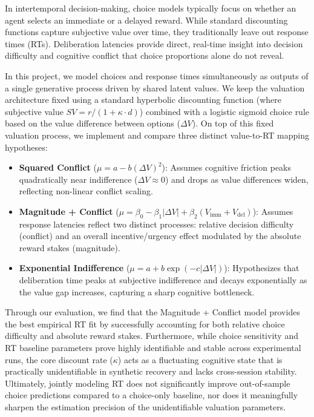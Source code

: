 \documentclass[11pt,a4paper]{article}
\theoremstyle{definition}
\begin{document}
In intertemporal decision-making, choice models typically focus on whether an agent selects an immediate or a delayed reward. While standard discounting functions capture subjective value over time, they traditionally leave out response times (RTs). Deliberation latencies provide direct, real-time insight into decision difficulty and cognitive conflict that choice proportions alone do not reveal.

In this project, we model choices and response times simultaneously as outputs of a single generative process driven by shared latent values. We keep the valuation architecture fixed using a standard hyperbolic discounting function (where subjective value $SV = r / (1 + \kappa \cdot d)$) combined with a logistic sigmoid choice rule based on the value difference between options ($\Delta V$). On top of this fixed valuation process, we implement and compare three distinct value-to-RT mapping hypotheses:

\begin{itemize}
    \item \textbf{Squared Conflict} ($\mu = a - b(\Delta V)^2$): Assumes cognitive friction peaks quadratically near indifference ($\Delta V \approx 0$) and drops as value differences widen, reflecting non-linear conflict scaling.
    \item \textbf{Magnitude + Conflict} ($\mu = \beta_0 - \beta_1|\Delta V| + \beta_2(V_{\text{imm}} + V_{\text{del}})$): Assumes response latencies reflect two distinct processes: relative decision difficulty (conflict) and an overall incentive/urgency effect modulated by the absolute reward stakes (magnitude).
    \item \textbf{Exponential Indifference} ($\mu = a + b \exp(-c|\Delta V|)$): Hypothesizes that deliberation time peaks at subjective indifference and decays exponentially as the value gap increases, capturing a sharp cognitive bottleneck.
\end{itemize}

Through our evaluation, we find that the Magnitude + Conflict model provides the best empirical RT fit by successfully accounting for both relative choice difficulty and absolute reward stakes. Furthermore, while choice sensitivity and RT baseline parameters prove highly identifiable and stable across experimental runs, the core discount rate ($\kappa$) acts as a fluctuating cognitive state that is practically unidentifiable in synthetic recovery and lacks cross-session stability. Ultimately, jointly modeling RT does not significantly improve out-of-sample choice predictions compared to a choice-only baseline, nor does it meaningfully sharpen the estimation precision of the unidentifiable valuation parameters.
\end{document}
